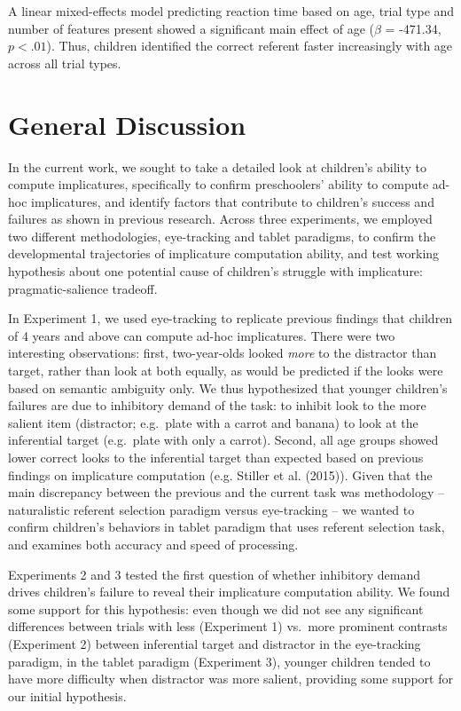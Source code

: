 \documentclass[a4paper,man,apacite,floatsintext]{apa6}
\begin{document}
A linear mixed-effects model predicting reaction time based on age,
trial type and number of features present showed a significant main
effect of age (\(\beta\) = -471.34, \(p < .01\)). Thus, children
identified the correct referent faster increasingly with age across all
trial types.

\section{General Discussion}\label{general-discussion}

In the current work, we sought to take a detailed look at children's
ability to compute implicatures, specifically to confirm preschoolers'
ability to compute ad-hoc implicatures, and identify factors that
contribute to children's success and failures as shown in previous
research. Across three experiments, we employed two different
methodologies, eye-tracking and tablet paradigms, to confirm the
developmental trajectories of implicature computation ability, and test
working hypothesis about one potential cause of children's struggle with
implicature: pragmatic-salience tradeoff.

In Experiment 1, we used eye-tracking to replicate previous findings
that children of 4 years and above can compute ad-hoc implicatures.
There were two interesting observations: first, two-year-olds looked
\emph{more} to the distractor than target, rather than look at both
equally, as would be predicted if the looks were based on semantic
ambiguity only. We thus hypothesized that younger children's failures
are due to inhibitory demand of the task: to inhibit look to the more
salient item (distractor; e.g.~plate with a carrot and banana) to look
at the inferential target (e.g.~plate with only a carrot). Second, all
age groups showed lower correct looks to the inferential target than
expected based on previous findings on implicature computation (e.g.
Stiller et al. (2015)). Given that the main discrepancy between the
previous and the current task was methodology -- naturalistic referent
selection paradigm versus eye-tracking -- we wanted to confirm
children's behaviors in tablet paradigm that uses referent selection
task, and examines both accuracy and speed of processing.

Experiments 2 and 3 tested the first question of whether inhibitory
demand drives children's failure to reveal their implicature computation
ability. We found some support for this hypothesis: even though we did
not see any significant differences between trials with less (Experiment
1) vs.~more prominent contrasts (Experiment 2) between inferential
target and distractor in the eye-tracking paradigm, in the tablet
paradigm (Experiment 3), younger children tended to have more difficulty
when distractor was more salient, providing some support for our initial
hypothesis.
\end{document}

